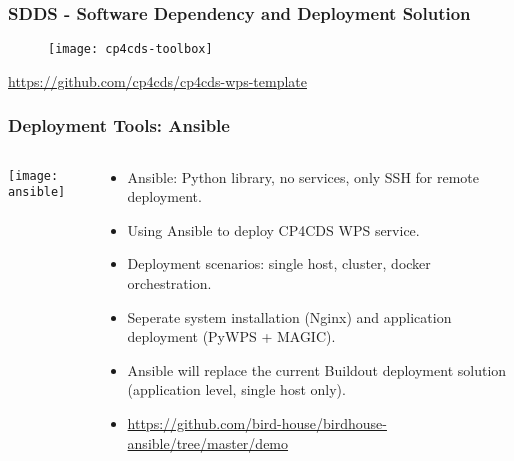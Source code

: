 \documentclass{beamer}
\begin{document}
\begin{frame}
\frametitle<presentation>{SDDS - Software Dependency and Deployment Solution}

  \begin{figure}[ht]
    \centering
    \texttt{[image: cp4cds-toolbox]}
  \end{figure}

  \centering
  \footnotesize{\url{https://github.com/cp4cds/cp4cds-wps-template}}

\end{frame}

\begin{frame}
\frametitle<presentation>{Deployment Tools: Ansible}
  \begin{columns}[c]
    \begin{column}{.2\textwidth}
      \texttt{[image: ansible]}
    \end{column}
    \begin{column}{.8\textwidth}
      \begin{itemize}
        \item Ansible: Python library, no services, only SSH for remote deployment.
        \item Using Ansible to deploy CP4CDS WPS service.
        \item Deployment scenarios: single host, cluster, docker orchestration.
        \item Seperate system installation (Nginx) and application deployment (PyWPS + MAGIC).
        \item Ansible will replace the current Buildout deployment solution (application level, single host only).
        \item \footnotesize{\url{https://github.com/bird-house/birdhouse-ansible/tree/master/demo}}
      \end{itemize}
    \end{column}
  \end{columns}
\end{frame}
\end{document}
